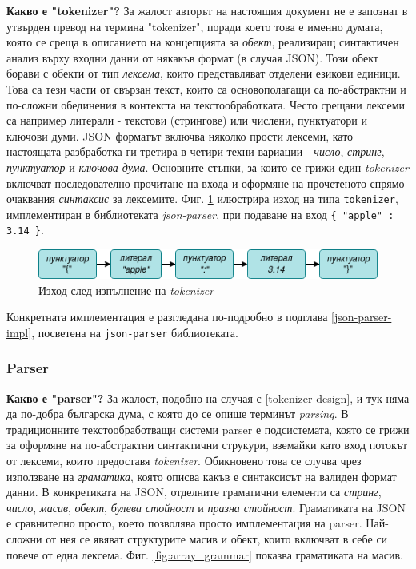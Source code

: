 \documentclass[10pt]{article}
\begin{document}
\textbf{Какво е "tokenizer"?} За жалост авторът на настоящия документ не е запознат в утвърден превод на термина "tokenizer", поради което това е именно думата, която се среща в описанието на концепцията за \textit{обект}, реализиращ синтактичен анализ върху входни данни от някакъв формат (в случая JSON). Този обект борави с обекти от тип \textit{лексема}, които представляват отделени езикови единици. Това са тези части от свързан текст, които са основополагащи са по-абстрактни и по-сложни обединения в контекста на текстообработката. Често срещани лексеми са например литерали - текстови (стрингове) или числени, пунктуатори и ключови думи. JSON форматът включва няколко прости лексеми, като настоящата разбработка ги третира в четири техни вариации - \textit{число}, \textit{стринг}, \textit{пунктуатор} и \textit{ключова дума}. Основните стъпки, за които се грижи един \textit{tokenizer} включват последователно прочитане на входа и оформяне на прочетеното спрямо очаквания \textit{синтаксис} за лексемите. Фиг. \ref{fig:tokenizer_output} илюстрира изход на типа \verb|tokenizer|, имплементиран в библиотеката \textit{json-parser}, при подаване на вход \verb|{ "apple" : 3.14 }|.

\begin{figure}[h]
\centering
\includegraphics[width=.65\linewidth]{tokenizer_output.png}
\caption{Изход след изпълнение на \textit{tokenizer}}
\label{fig:tokenizer_output}
\end{figure}

Конкретната имплементация е разгледана по-подробно в подглава \ref{json-parser-impl}, посветена на \verb|json-parser| библиотеката. 

\subsubsection{Parser}
\textbf{Какво е "parser"?} За жалост, подобно на случая с \ref{tokenizer-design}, и тук няма да по-добра българска дума, с която до се опише терминът \textit{parsing}. В традиционните текстообработващи системи parser е подсистемата, която се грижи за оформяне на по-абстрактни синтактични струкури, вземайки като вход потокът от лексеми, които предоставя \textit{tokenizer}. Обикновено това се случва чрез използване на \textit{граматика}, която описва какъв е синтаксисът на валиден формат данни. В конкретиката на JSON, отделните граматични елементи са \textit{стринг}, \textit{число}, \textit{масив}, \textit{обект}, \textit{булева стойност} и \textit{празна стойност}. Граматиката на JSON е сравнително просто, което позволява просто имплементация на parser. Най-сложни от нея се явяват структурите масив и обект, които включват в себе си повече от една лексема. Фиг. \ref{fig:array_grammar} показва граматиката на масив. 
\end{document}
